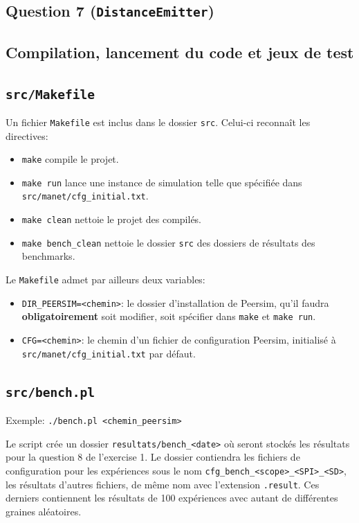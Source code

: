 \documentclass[a4paper]{article}
\begin{document}
\subsection{Question 7 (\texttt{DistanceEmitter})}


\pagebreak


\begin{appendix}
  \section{Compilation, lancement du code et jeux de test}
  \subsection{\texttt{src/Makefile}}
    Un fichier \texttt{Makefile} est inclus dans le dossier
    \texttt{src}. Celui-ci reconnaît les directives:
    \begin{itemize}
    \item \texttt{make} compile le projet.
    \item \texttt{make run} lance une instance de simulation telle que
      spécifiée dans \texttt{src/manet/cfg\_initial.txt}.
    \item \texttt{make clean} nettoie le projet des compilés.
    \item \texttt{make bench\_clean} nettoie le dossier \texttt{src}
      des dossiers de résultats des benchmarks.\\
    \end{itemize}

    Le \texttt{Makefile} admet par ailleurs deux variables:
    \begin{itemize}
    \item \texttt{DIR\_PEERSIM=<chemin>}: le dossier d'installation de
      Peersim, qu'il faudra \textbf{obligatoirement} soit modifier,
      soit spécifier dans \texttt{make} et \texttt{make run}.
    \item \texttt{CFG=<chemin>}: le chemin d'un fichier de
      configuration Peersim, initialisé à \texttt{src/manet/cfg\_initial.txt} par défaut.
    \end{itemize}

    \subsection{\texttt{src/bench.pl}}
    Exemple: \texttt{./bench.pl <chemin\_peersim>}

    Le script crée un dossier \texttt{resultats/bench\_<date>} où seront stockés les
    résultats pour la question 8 de l'exercise 1. Le dossier contiendra
    les fichiers de configuration pour les expériences sous le nom
    \texttt{cfg\_bench\_<scope>\_<SPI>\_<SD>}, les résultats d'autres
    fichiers, de même nom avec l'extension \texttt{.result}. Ces derniers contiennent les résultats de 100 expériences avec autant de différentes graines aléatoires.


\end{appendix}
\end{document}
